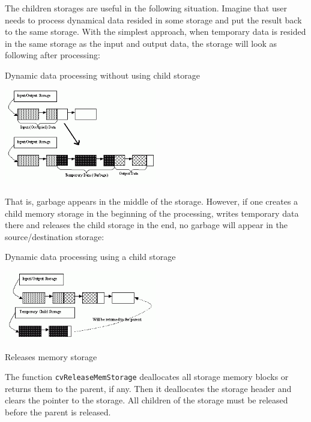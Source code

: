 The children storages are useful in the following situation. Imagine
that user needs to process dynamical data resided in some storage and
put the result back to the same storage. With the simplest approach,
when temporary data is resided in the same storage as the input and
output data, the storage will look as following after processing:

Dynamic data processing without using child storage

\includegraphics[width=0.5\textwidth]{pics/memstorage1.png}

That is, garbage appears in the middle of the storage. However, if
one creates a child memory storage in the beginning of the processing,
writes temporary data there and releases the child storage in the end,
no garbage will appear in the source/destination storage:

Dynamic data processing using a child storage

\includegraphics[width=0.5\textwidth]{pics/memstorage2.png}

\label{ReleaseMemStorage}

Releases memory storage


\begin{description}
\end{description}

The function \texttt{cvReleaseMemStorage} deallocates all storage memory
blocks or returns them to the parent, if any. Then it deallocates the
storage header and clears the pointer to the storage. All children of
the storage must be released before the parent is released.

